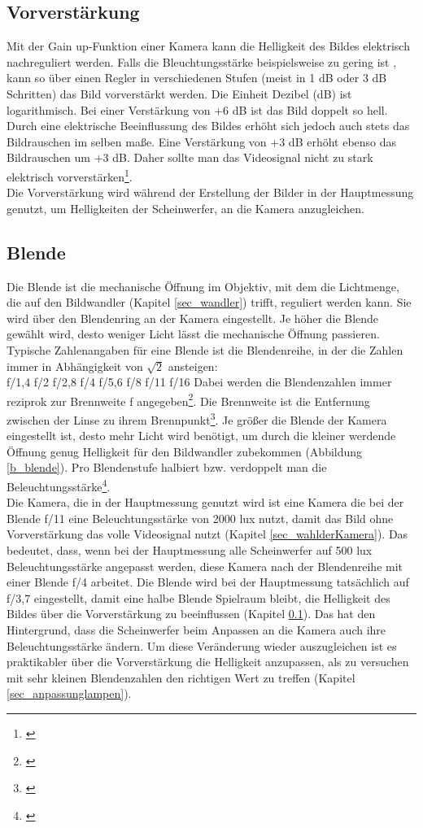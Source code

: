 \subsection{Vorverstärkung}
\label{sec_gain}
Mit der \glqq Gain up\grqq -Funktion einer Kamera kann die Helligkeit des Bildes elektrisch nachreguliert werden. Falls die Bleuchtungsstärke beispielsweise zu gering ist , kann so über einen Regler in verschiedenen Stufen (meist in 1 dB oder 3 dB Schritten) das Bild vorverstärkt werden. Die Einheit Dezibel (dB) ist logarithmisch. Bei einer Verstärkung von +6 dB ist das Bild doppelt so hell. Durch eine elektrische Beeinflussung des Bildes erhöht sich jedoch auch stets das Bildrauschen im selben maße. Eine Verstärkung von +3 dB erhöht ebenso das Bildrauschen um +3 dB. Daher sollte man das Videosignal nicht zu stark elektrisch vorverstärken\footnote{\cite[406-407]{schmidt}}.\\
Die Vorverstärkung wird während der Erstellung der Bilder in der Hauptmessung genutzt, um Helligkeiten der Scheinwerfer, an die Kamera anzugleichen.

\subsection{Blende}
\label{sec_blende}
Die Blende ist die mechanische Öffnung im Objektiv, mit dem die Lichtmenge, die auf den Bildwandler (Kapitel \ref{sec_wandler}) trifft, reguliert werden kann. Sie wird über den Blendenring an der Kamera eingestellt. Je höher die Blende gewählt wird, desto weniger Licht lässt die mechanische Öffnung passieren. Typische Zahlenangaben für eine Blende ist die Blendenreihe, in der die Zahlen immer in Abhängigkeit von $\sqrt{2}$ ansteigen: \\
f/1,4  f/2  f/2,8  f/4  f/5,6  f/8  f/11  f/16
Dabei werden die Blendenzahlen immer reziprok zur Brennweite f angegeben\footnote{\cite[387]{schmidt}}. Die Brennweite ist die Entfernung zwischen der Linse zu ihrem Brennpunkt\footnote{\cite{rosko}}. Je größer die Blende der Kamera eingestellt ist, desto mehr Licht wird benötigt, um durch die kleiner werdende Öffnung genug Helligkeit für den Bildwandler zubekommen (Abbildung \ref{b_blende}). Pro Blendenstufe halbiert bzw. verdoppelt man die Beleuchtungsstärke\footnote{\cite[388]{schmidt}}.\\
Die Kamera, die in der Hauptmessung genutzt wird ist eine Kamera die bei der Blende f/11 eine Beleuchtungsstärke von 2000 lux nutzt, damit das Bild ohne Vorverstärkung das volle Videosignal nutzt (Kapitel \ref{sec_wahlderKamera}). Das bedeutet, dass, wenn bei der Hauptmessung alle Scheinwerfer auf 500 lux Beleuchtungsstärke angepasst werden, diese Kamera nach der Blendenreihe mit einer Blende f/4 arbeitet. Die Blende wird bei der Hauptmessung tatsächlich auf f/3,7 eingestellt, damit eine halbe Blende Spielraum bleibt, die Helligkeit des Bildes über die Vorverstärkung zu beeinflussen (Kapitel \ref{sec_gain}). Das hat den Hintergrund, dass die Scheinwerfer beim Anpassen an die Kamera auch ihre Beleuchtungsstärke ändern. Um diese Veränderung wieder auszugleichen ist es praktikabler über die Vorverstärkung die Helligkeit anzupassen, als zu versuchen mit sehr kleinen Blendenzahlen den richtigen Wert zu treffen (Kapitel \ref{sec_anpassunglampen}).

